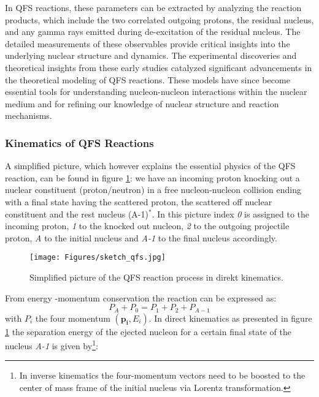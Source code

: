 In QFS reactions, these parameters can be extracted by analyzing the reaction products, which include the two correlated outgoing protons, the residual nucleus, and any gamma rays emitted during de-excitation of the residual nucleus. The detailed measurements of these observables provide critical insights into the underlying nuclear structure and dynamics.\newline
The experimental discoveries and theoretical insights from these early studies catalyzed significant advancements in the theoretical modeling of QFS reactions. These models have since become essential tools for understanding nucleon-nucleon interactions within the nuclear medium and for refining our knowledge of nuclear structure and reaction mechanisms.\newline
\subsubsection{Kinematics of QFS Reactions}\label{sec:kin_qfs}
A simplified picture, which however explains the essential physics of the QFS reaction, can be found in figure \ref{fig:sketch_qfs}: we have an incoming proton knocking out a nuclear constituent (proton/neutron) in a free nucleon-nucleon collision ending with a final state having the scattered proton, the scattered  off nuclear constituent and the rest nucleus (A-1)$^*$. In this picture index \textit{0} is assigned to the incoming proton, \textit{1} to the knocked out nucleon, \textit{2} to the outgoing projectile proton, \textit{A} to the initial nucleus and  \textit{A-1} to the final nucleus accordingly.
\begin{figure}[htpb]
    \centering
    \texttt{[image: Figures/sketch\_qfs.jpg]}
    \caption{
   	Simplified picture of the QFS reaction process in direkt kinematics.  
    }
    \label{fig:sketch_qfs}
\end{figure}
From energy -momentum conservation the reaction can be expressed as:
\begin{equation}\label{eq:four_mom_cons_qfs}
P_A  +  P_0 = P_1 + P_2 +P_{A-1} 
\end{equation}
with $P_i$ the four momentum $(\mathbf{p_i},E_i)$.\newline
In direct kinematics as presented in figure \ref{fig:sketch_qfs} the separation energy  of the ejected nucleon for a certain final state of the nucleus \textit{A-1} is given by\footnote{In inverse kinematics the four-momentum vectors need to be boosted to the center of mass frame of the initial nucleus via Lorentz transformation.}:
